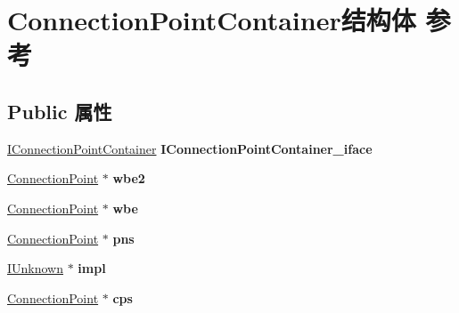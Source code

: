 \hypertarget{struct_connection_point_container}{}\section{Connection\+Point\+Container结构体 参考}
\label{struct_connection_point_container}
\subsection*{Public 属性}
\begin{DoxyCompactItemize}
\item 
\mbox{\label{struct_connection_point_container_aa12ed4f3eb633077d636452878b7b42b}} 
\hyperlink{interface_i_connection_point_container}{I\+Connection\+Point\+Container} {\bfseries I\+Connection\+Point\+Container\+\_\+iface}
\item 
\mbox{\label{struct_connection_point_container_a25dad8f1e3e47ee97bddcb7e923bb66a}} 
\hyperlink{struct_connection_point}{Connection\+Point} $\ast$ {\bfseries wbe2}
\item 
\mbox{\label{struct_connection_point_container_ab7026bfedbef62b53d9b94720058d34f}} 
\hyperlink{struct_connection_point}{Connection\+Point} $\ast$ {\bfseries wbe}
\item 
\mbox{\label{struct_connection_point_container_a2437019e3e8021ab90abfc910312aaa0}} 
\hyperlink{struct_connection_point}{Connection\+Point} $\ast$ {\bfseries pns}
\item 
\mbox{\label{struct_connection_point_container_a6fcfa0b4e84856bf3fdba5f369ea67e0}} 
\hyperlink{interface_i_unknown}{I\+Unknown} $\ast$ {\bfseries impl}
\item 
\mbox{\label{struct_connection_point_container_a11e0a3399391083ae575c58eeeb8f51c}} 
\hyperlink{struct_connection_point}{Connection\+Point} $\ast$ {\bfseries cps}
\item 
\mbox{\label{struct_connection_point_container_a9d6ea5aa546d74829025632ac4304fca}} 

\end{DoxyCompactItemize}
